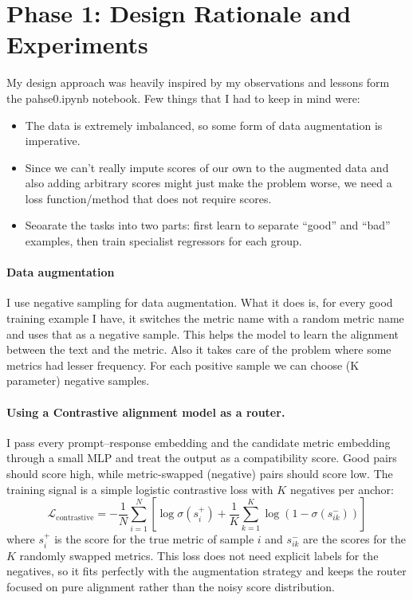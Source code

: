\documentclass[11pt]{article}
\begin{document}
\newpage
\section{Phase 1: Design Rationale and Experiments}

My design approach was heavily inspired by my observations and lessons form the pahse0.ipynb notebook. Few things that I had to keep in mind were:
\begin{itemize}
    \item The data is extremely imbalanced, so some form of data augmentation is imperative.
    \item Since we can't really impute scores of our own to the augmented data and also adding arbitrary scores might just make the problem worse, we need a loss function/method that does not require scores. 
    \item Seoarate the tasks into two parts: first learn to separate ``good'' and ``bad'' examples, then train specialist regressors for each group.
\end{itemize}

\paragraph{Data augmentation}
I use negative sampling for data augmentation. What it does is, for every good training example I have, it switches the metric name with a random metric name and uses that as a negative sample. This helps the model to learn the alignment between the text and the metric. Also it takes care of the problem where some metrics had lesser frequency. For each positive sample we can choose (K parameter) negative samples.

\paragraph{Using a Contrastive alignment model as a router.}
I pass every prompt--response embedding and the candidate metric embedding through a small MLP and treat the output as a compatibility score. Good pairs should score high, while metric-swapped (negative) pairs should score low. The training signal is a simple logistic contrastive loss with \(K\) negatives per anchor:
\begin{equation}
\label{eq:contrastive_loss}
\mathcal{L}_{\text{contrastive}} = -\frac{1}{N}\sum_{i=1}^{N}\left[ \log \sigma\!\left(s_i^{+}\right) + \frac{1}{K}\sum_{k=1}^{K}\log\left(1 - \sigma\!\left(s_{ik}^{-}\right)\right) \right]
\end{equation}
where \(s_i^{+}\) is the score for the true metric of sample \(i\) and \(s_{ik}^{-}\) are the scores for the \(K\) randomly swapped metrics. This loss does not need explicit labels for the negatives, so it fits perfectly with the augmentation strategy and keeps the router focused on pure alignment rather than the noisy score distribution.
\end{document}
